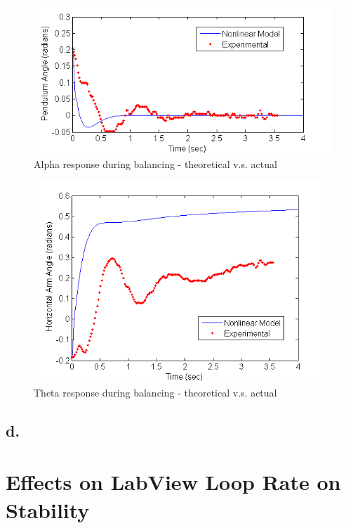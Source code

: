 \documentclass{article}
\theoremstyle{plain}
\theoremstyle{definition}
\theoremstyle{remark}
\begin{document}
\begin{figure}[htb]
\begin{center}
\includegraphics[width = 12cm]{Q6_C_Alpha.png}
\end{center}
\caption{Alpha response during balancing - theoretical v.s. actual}
\label{q6_c_alpha}
\end{figure}

\begin{figure}[htb]
\begin{center}
\includegraphics[width = 11cm]{Q6_C_Theta.png}
\end{center}
\caption{Theta response during balancing - theoretical v.s. actual}
\label{q6_c_theta}
\end{figure}

\clearpage

\subsection*{d.}

\clearpage
\section{Effects on LabView Loop Rate on Stability}
\end{document}
